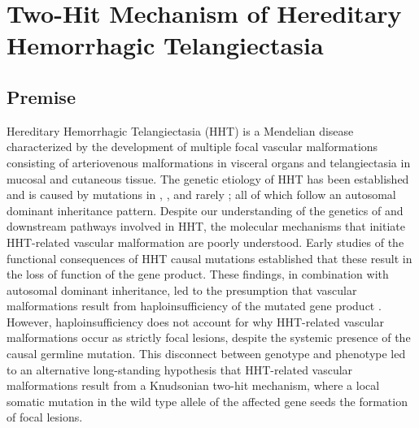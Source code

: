 \chapter{Two-Hit Mechanism of Hereditary Hemorrhagic Telangiectasia}
\label{chap:hht}

\clearpage

\section{Premise}
Hereditary Hemorrhagic Telangiectasia (HHT) is a Mendelian disease characterized by the development of multiple focal vascular malformations consisting of arteriovenous malformations in visceral organs and telangiectasia in mucosal and cutaneous tissue. The genetic etiology of HHT has been established and is caused by mutations in  \citep{mcallister1994},  \citep{johnson1996}, and rarely  \citep{gallione2004}; all of which follow an autosomal dominant inheritance pattern. Despite our understanding of the genetics of and downstream pathways involved in HHT, the molecular mechanisms that initiate HHT-related vascular malformation are poorly understood. Early studies of the functional consequences of HHT causal mutations established that these result in the loss of function of the gene product. These findings, in combination with autosomal dominant inheritance, led to the presumption that vascular malformations result from haploinsufficiency of the mutated gene product \citep{pece1997, abdalla2000, ola2018}. However, haploinsufficiency does not account for why HHT-related vascular malformations occur as strictly focal lesions, despite the systemic presence of the causal germline mutation. This disconnect between genotype and phenotype led to an alternative long-standing hypothesis that HHT-related vascular malformations result from a Knudsonian two-hit mechanism, where a local somatic mutation in the wild type allele of the affected gene seeds the formation of focal lesions.


